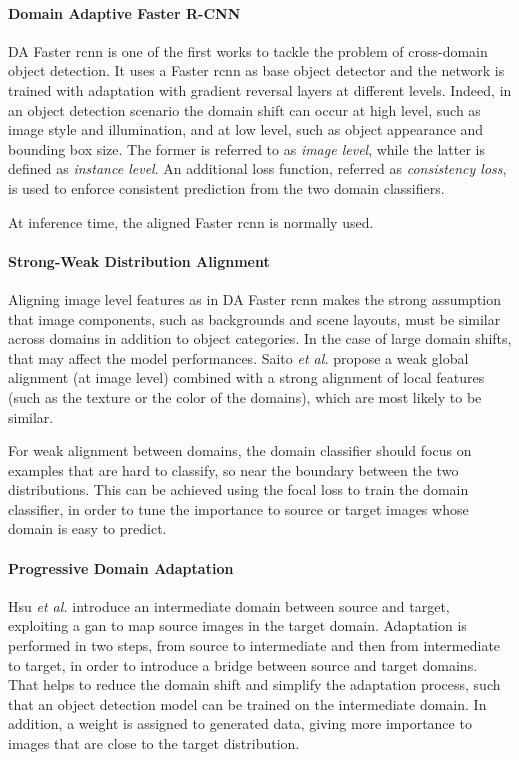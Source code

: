 \documentclass[%
    corpo=12pt,
    twoside,
    stile=classica,   
    tipotesi=magistrale,
    evenboxes,
    english
]{toptesi}
\begin{document}
\paragraph{Domain Adaptive Faster R-CNN}\label{sec:dafrcnn}
DA Faster \acrshort{rcnn}\cite{chen2018domain} is one of the first works to tackle the problem of cross-domain object detection. It uses a Faster \acrshort{rcnn} as base object detector and the network is trained with adaptation with gradient reversal layers at different levels. Indeed, in an object detection scenario the domain shift can occur at high level, such as image style and illumination, and at low level, such as object appearance and bounding box size. The former is referred to as \textit{image level}, while the latter is defined as \textit{instance level}. An additional loss function, referred as \textit{consistency loss}, is used to enforce consistent prediction from the two domain classifiers.

At inference time, the aligned Faster \gls{rcnn} is normally used.

\paragraph{Strong-Weak Distribution Alignment}
Aligning image level features as in DA Faster \acrshort{rcnn} makes the strong assumption that image components, such as backgrounds and scene layouts, must be similar across domains in addition to object categories. In the case of large domain shifts, that may affect the model performances. Saito \emph{et al.}\cite{saito2019strongweak} propose a weak global alignment (at image level) combined with a strong alignment of local features (such as the texture or the color of the domains), which are most likely to be similar.

For weak alignment between domains, the domain classifier should focus on examples that are hard to classify, so near the boundary between the two distributions. This can be achieved using the focal loss to train the domain classifier, in order to tune the importance to source or target images whose domain is easy to predict.

\paragraph{Progressive Domain Adaptation}
Hsu \emph{et al.}\cite{hsu2019progressive} introduce an intermediate domain between source and target, exploiting a \gls{gan} to map source images in the target domain. Adaptation is performed in two steps, from source to intermediate and then from intermediate to target, in order to introduce a bridge between source and target domains. That helps to reduce the domain shift and simplify the adaptation process, such that an object detection model can be trained on the intermediate domain. In addition, a weight is assigned to generated data, giving more importance to images that are close to the target distribution.
\end{document}
